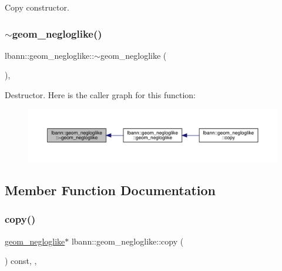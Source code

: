 Copy constructor. \mbox{\label{classlbann_1_1geom__negloglike_a15078d619f246c8bc891212d6ff276db}} 
\subsubsection{\texorpdfstring{$\sim$geom\+\_\+negloglike()}{~geom\_negloglike()}}
{\footnotesize\ttfamily lbann\+::geom\+\_\+negloglike\+::$\sim$geom\+\_\+negloglike (\begin{DoxyParamCaption}{ }\end{DoxyParamCaption})\hspace{0.3cm}{\ttfamily [override]}, {\ttfamily [default]}}

Destructor. Here is the caller graph for this function\+:\nopagebreak
\begin{figure}[H]
\begin{center}
\leavevmode
\includegraphics[width=350pt]{classlbann_1_1geom__negloglike_a15078d619f246c8bc891212d6ff276db_icgraph}
\end{center}
\end{figure}


\subsection{Member Function Documentation}
\mbox{\label{classlbann_1_1geom__negloglike_aa9be2be40a9bbc9599c2e2de3c01872e}} 
\subsubsection{\texorpdfstring{copy()}{copy()}}
{\footnotesize\ttfamily \hyperlink{classlbann_1_1geom__negloglike}{geom\+\_\+negloglike}$\ast$ lbann\+::geom\+\_\+negloglike\+::copy (\begin{DoxyParamCaption}{ }\end{DoxyParamCaption}) const\hspace{0.3cm}{\ttfamily [inline]}, {\ttfamily [override]}, {\ttfamily [virtual]}}

